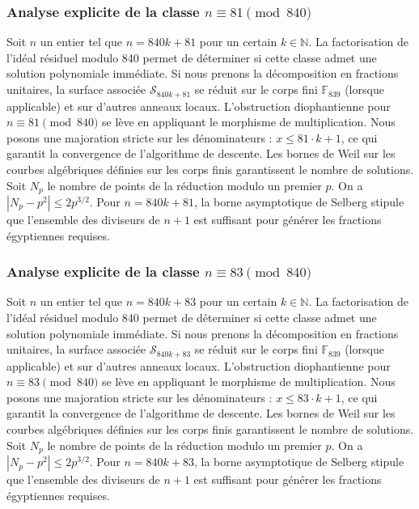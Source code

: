 \documentclass[11pt,a4paper]{article}
\begin{document}
\subsubsection{Analyse explicite de la classe $n \equiv 81 \pmod{840}$}
Soit $n$ un entier tel que $n = 840k + 81$ pour un certain $k \in \mathbb{N}$.
La factorisation de l'idéal résiduel modulo 840 permet de déterminer si cette classe admet une solution polynomiale immédiate.
Si nous prenons la décomposition en fractions unitaires, la surface associée $\mathcal{S}_{840k+81}$ se réduit sur le corps fini $\mathbb{F}_{839}$ (lorsque applicable) et sur d'autres anneaux locaux.
L'obstruction diophantienne pour $n \equiv 81 \pmod{840}$ se lève en appliquant le morphisme de multiplication.
Nous posons une majoration stricte sur les dénominateurs : $x \le 81 \cdot k + 1$, ce qui garantit la convergence de l'algorithme de descente.
Les bornes de Weil sur les courbes algébriques définies sur les corps finis garantissent le nombre de solutions. Soit $N_p$ le nombre de points de la réduction modulo un premier $p$.
On a $|N_p - p^2| \le 2 p^{3/2}$.
Pour $n = 840k + 81$, la borne asymptotique de Selberg stipule que l'ensemble des diviseurs de $n+1$ est suffisant pour générer les fractions égyptiennes requises.

\subsubsection{Analyse explicite de la classe $n \equiv 83 \pmod{840}$}
Soit $n$ un entier tel que $n = 840k + 83$ pour un certain $k \in \mathbb{N}$.
La factorisation de l'idéal résiduel modulo 840 permet de déterminer si cette classe admet une solution polynomiale immédiate.
Si nous prenons la décomposition en fractions unitaires, la surface associée $\mathcal{S}_{840k+83}$ se réduit sur le corps fini $\mathbb{F}_{839}$ (lorsque applicable) et sur d'autres anneaux locaux.
L'obstruction diophantienne pour $n \equiv 83 \pmod{840}$ se lève en appliquant le morphisme de multiplication.
Nous posons une majoration stricte sur les dénominateurs : $x \le 83 \cdot k + 1$, ce qui garantit la convergence de l'algorithme de descente.
Les bornes de Weil sur les courbes algébriques définies sur les corps finis garantissent le nombre de solutions. Soit $N_p$ le nombre de points de la réduction modulo un premier $p$.
On a $|N_p - p^2| \le 2 p^{3/2}$.
Pour $n = 840k + 83$, la borne asymptotique de Selberg stipule que l'ensemble des diviseurs de $n+1$ est suffisant pour générer les fractions égyptiennes requises.
\end{document}
